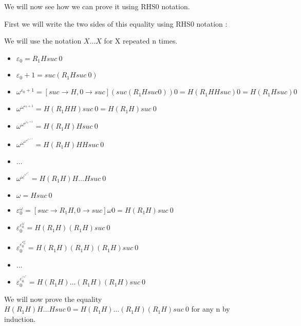 \documentclass[10pt]{article}
\begin{document}
We will now see how we can prove it using RHS0 notation.

First we will write the two sides of this equality using RHS0 notation :

We will use the notation \( X \ldots X \) for X repeated n times.

\begin{itemize}
     \setlength{\itemsep}{1pt}
     \setlength{\parskip}{0pt}
     \setlength{\parsep}{0pt}
\item \( \varepsilon_0 = R_1 H suc\ 0 \)
\item \( \varepsilon_0 + 1 = suc (R_1 H suc\ 0) \)
\item \( \omega^{\varepsilon_0+1} = [suc \rightarrow H, 0 \rightarrow suc] (suc (R_1 H suc 0)) 0 = H (R_1 H H suc) 0 = H (R_1 H suc) 0 \)
\item \( \omega^{\omega^{\varepsilon_0+1}} = H (R_1 H H) suc\ 0 = H (R_1 H) suc\ 0 \)
\item \( \omega^{\omega^{\omega^{\varepsilon_0+1}}} = H (R_1 H) H suc\ 0 \)
\item \( \omega^{\omega^{\omega^{\omega^{\varepsilon_0+1}}}} = H (R_1 H) H H suc\ 0 \)
\item \( \ldots \)
\item \( \omega^{\omega^{\vdots^{\omega^{\omega^{\varepsilon_0}}}}} = H (R_1 H) H \ldots H suc\ 0 \)
\end{itemize}

\begin{itemize}
     \setlength{\itemsep}{1pt}
     \setlength{\parskip}{0pt}
     \setlength{\parsep}{0pt}
\item \( \omega = H suc\ 0 \)
\item \( \varepsilon_0^\omega = [suc \rightarrow R_1 H, 0 \rightarrow suc] \omega 0 = H (R_1 H) suc\ 0 \)
\item \( \varepsilon_0^{\varepsilon_0^\omega} = H (R_1 H) (R_1 H) suc\ 0 \)
\item \( \varepsilon_0^{\varepsilon_0^{\varepsilon_0^\omega}} = H (R_1 H) (R_1 H) (R_1 H) suc\ 0 \)
\item \( \ldots \)
\item \( \varepsilon_0^{\varepsilon_0^{\vdots^{{\varepsilon_0}^\omega}}} = H (R_1 H) \ldots (R_1 H) (R_1 H) suc\ 0 \)
\end{itemize}

We will now prove the equality \( H (R_1 H) H \ldots H suc\ 0 = H (R_1 H) \ldots (R_1 H) (R_1 H) suc\ 0 \) for any n by induction.

\bigskip
\end{document}
